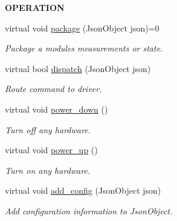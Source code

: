 \begin{Indent}{\bf O\+P\+E\+R\+A\+T\+I\+ON}\par
\begin{DoxyCompactItemize}
\item 
virtual void \hyperlink{class_loom_module_a84f1c1f3340203a3457b5ffe0bd53a53}{package} (Json\+Object json)=0
\begin{DoxyCompactList}\small\item\em Package a modules measurements or state. \end{DoxyCompactList}\item 
virtual bool \hyperlink{class_loom_module_aa4e7db1687a95e41ee418c201677fff8}{dispatch} (Json\+Object json)
\begin{DoxyCompactList}\small\item\em Route command to driver. \end{DoxyCompactList}\item 
virtual void \hyperlink{class_loom_module_a31ea02275e356c6ce0d01fdb6d4190df}{power\+\_\+down} ()
\begin{DoxyCompactList}\small\item\em Turn off any hardware. \end{DoxyCompactList}\item 
virtual void \hyperlink{class_loom_module_aa0683cb24ce1cc49273440e79f035e23}{power\+\_\+up} ()
\begin{DoxyCompactList}\small\item\em Turn on any hardware. \end{DoxyCompactList}\item 
virtual void \hyperlink{class_loom_module_a06747f16d76bde35575557c7515adcc0}{add\+\_\+config} (Json\+Object json)
\begin{DoxyCompactList}\small\item\em Add configuration information to Json\+Object. \end{DoxyCompactList}\end{DoxyCompactItemize}
\end{Indent}
